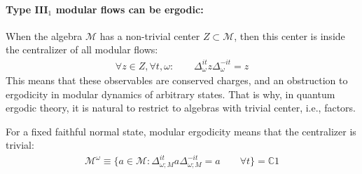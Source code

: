 \documentclass[a4paper,11pt]{article}
\theoremstyle{definition}
\newcommand{\mE}{\mathcal{E}}
\begin{document}



\paragraph{Type III$_1$ modular flows can be ergodic:}

When the algebra $\mathcal M$ has a non-trivial center $Z\subset \mathcal M$, then this center is inside the centralizer of all modular flows:
\begin{align}
    \forall z\in Z,\forall t,\omega:\qquad \Delta_{\omega}^{it}z \Delta_\omega^{-it}=z
\end{align}
This means that these observables are conserved charges, and an obstruction to ergodicity in modular dynamics of arbitrary states. That is why, in quantum ergodic theory, it is natural to restrict to algebras with trivial center, i.e., factors.

For a fixed faithful normal state, modular ergodicity means that the centralizer is trivial:
\begin{align}
    \label{eq:modular-ergodicity}
    \mathcal M^\omega\equiv \{a\in \mathcal M:\Delta_{\omega;M}^{it}a\Delta_{\omega;M}^{-it}=a\qquad \forall t\}=\mathbb{C} 1
\end{align}
\end{document}
